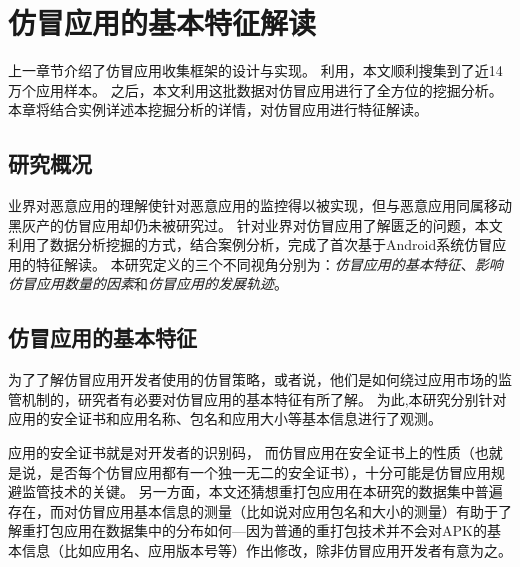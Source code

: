 \chapter{仿冒应用的基本特征解读}
\label{chp:discoveries}

上一章节介绍了仿冒应用收集框架\mytool 的设计与实现。
利用\mytool，本文顺利搜集到了近14万个应用样本。
之后，本文利用这批数据对仿冒应用进行了全方位的挖掘分析。
本章将结合实例详述本挖掘分析的详情，对仿冒应用进行特征解读。

\section{研究概况}
业界对恶意应用的理解使针对恶意应用的监控得以被实现，但与恶意应用同属移动黑灰产的仿冒应用却仍未被研究过。
针对业界对仿冒应用了解匮乏的问题，本文利用了数据分析挖掘的方式，结合案例分析，完成了首次基于Android系统仿冒应用的特征解读。
本研究定义的三个不同视角分别为：\emph{仿冒应用的基本特征}、\emph{影响仿冒应用数量的因素}和\emph{仿冒应用的发展轨迹}。

\section{仿冒应用的基本特征}
\label{sec:fakeCharacteristics}
为了了解仿冒应用开发者使用的仿冒策略，或者说，他们是如何绕过应用市场的监管机制的，研究者有必要对仿冒应用的基本特征有所了解。
为此,本研究分别针对应用的安全证书和应用名称、包名和应用大小等基本信息进行了观测。

应用的安全证书就是对开发者的识别码，
而仿冒应用在安全证书上的性质（也就是说，是否每个仿冒应用都有一个独一无二的安全证书），十分可能是仿冒应用规避监管技术的关键。
另一方面，本文还猜想重打包应用在本研究的数据集中普遍存在，而对仿冒应用基本信息的测量（比如说对应用包名和大小的测量）有助于了解重打包应用在数据集中的分布如何---因为普通的重打包技术并不会对APK的基本信息（比如应用名、应用版本号等）作出修改，除非仿冒应用开发者有意为之。

